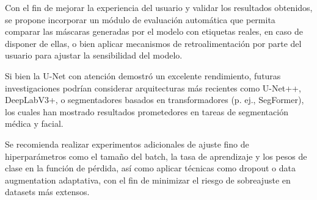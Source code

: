 Con el fin de mejorar la experiencia del usuario y validar los resultados obtenidos, se propone incorporar un módulo de evaluación automática que permita comparar las máscaras generadas por el modelo con etiquetas reales, en caso de disponer de ellas, o bien aplicar mecanismos de retroalimentación por parte del usuario para ajustar la sensibilidad del modelo.

Si bien la U-Net con atención demostró un excelente rendimiento, futuras investigaciones podrían considerar arquitecturas más recientes como U-Net++, DeepLabV3+, o segmentadores basados en transformadores (p. ej., SegFormer), los cuales han mostrado resultados prometedores en tareas de segmentación médica y facial.

Se recomienda realizar experimentos adicionales de ajuste fino de hiperparámetros como el tamaño del batch, la tasa de aprendizaje y los pesos de clase en la función de pérdida, así como aplicar técnicas como dropout o data augmentation adaptativa, con el fin de minimizar el riesgo de sobreajuste en datasets más extensos.

